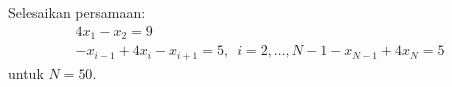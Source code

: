 Selesaikan persamaan:
\begin{align}
4x_{1} - x_{2} = 9 \\
-x_{i-1} + 4x_{i} - x_{i+1} = 5,\,\,\, i = 2,\ldots,N-1
-x_{N-1} + 4x_{N} = 5
\end{align}
untuk $N = 50$.